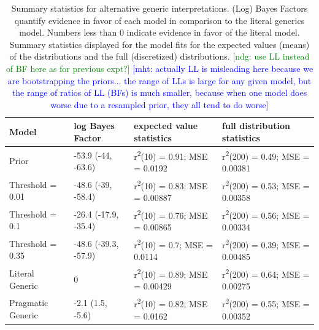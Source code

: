 \documentclass[floatsintext,doc]{apa6}
\newcommand{\mht}[1]{{\textcolor{Blue}{[mht: #1]}}}
\newcommand{\ndg}[1]{{\textcolor{Green}{[ndg: #1]}}}
\begin{document}
\begin{table}[h]
\centering
\begingroup\fontsize{9pt}{10pt}\selectfont
\begin{tabular}{llll}
  \hline
Model & log Bayes Factor & expected value statistics & full distribution statistics \\ 
  \hline
Prior & -53.9 (-44, -63.6) & r\textsuperscript{2}(10) = 0.91; MSE = 0.0192 & r\textsuperscript{2}(200) = 0.49; MSE = 0.00381 \\ 
  Threshold = 0.01 & -48.6 (-39, -58.4) & r\textsuperscript{2}(10) = 0.83; MSE = 0.00887 & r\textsuperscript{2}(200) = 0.53; MSE = 0.00358 \\ 
  Threshold = 0.1 & -26.4 (-17.9, -35.4) & r\textsuperscript{2}(10) = 0.76; MSE = 0.00865 & r\textsuperscript{2}(200) = 0.56; MSE = 0.00334 \\ 
  Threshold = 0.35 & -48.6 (-39.3, -57.9) & r\textsuperscript{2}(10) = 0.7; MSE = 0.0114 & r\textsuperscript{2}(200) = 0.39; MSE = 0.00485 \\ 
  Literal Generic & 0 & r\textsuperscript{2}(10) = 0.89; MSE = 0.00429 & r\textsuperscript{2}(200) = 0.64; MSE = 0.00275 \\ 
  Pragmatic Generic & -2.1 (1.5, -5.6) & r\textsuperscript{2}(10) = 0.82; MSE = 0.0162 & r\textsuperscript{2}(200) = 0.55; MSE = 0.00352 \\ 
   \hline
\end{tabular}
\endgroup
\caption{Summary statistics for alternative generic interpretations. (Log) Bayes Factors quantify evidence in favor of each model in comparison to the literal generics model. Numbers less than 0 indicate evidence in favor of the literal model. Summary statistics displayed for the model fits for the expected values (means) of the distributions and the full (discretized) distributions. \ndg{use LL instead of BF here as for previous expt?} \mht{actually LL is misleading here because we are bootstrapping the priors... the range of LLs is large for any given model, but the range of ratios of LL (BFs) is much smaller, because when one model does worse due to a resampled prior, they all tend to do worse}} 
\end{table}
\end{document}
